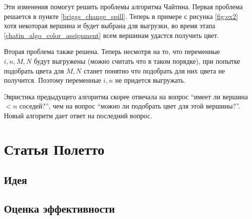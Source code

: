 \documentclass[12pt]{article}
\begin{document}
Эти изменения помогут решить проблемы алгоритма Чайтина. Первая проблема решается в пункте \ref{briggs_change_spill}.
Теперь в примере с рисунка \ref{fig:ex2} хотя некоторая вершина и будет выбрана для выгрузки, во время этапа \ref{chatin_algo_color_assignment}
всем вершинам удастся получить цвет.

Вторая проблема также решена. Теперь несмотря на то, что переменные $i, n, M, N$ будут выгружены (можно считать что в таком
порядке), при попытке подобрать цвета для $M, N$ станет понятно что подобрать для них цвета не получится.
Поэтому переменные $i, n$ не придется выгружать.

Эвристика предыдущего алгоритма скорее отвечала на
вопрос ``имеет ли вершина $< n$ соседей?'', чем на вопрос ``можно ли подобрать цвет для этой вершины?''. Новый
алгоритм дает ответ на последний вопрос.

\section{Статья Полетто}
\subsection{Идея}
\subsection{Оценка эффективности}
\end{document}
